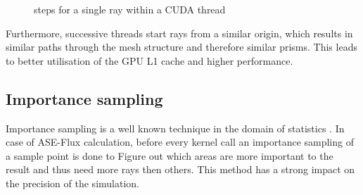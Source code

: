 \begin{figure}[H]
  \centerline
  {}
  \caption{steps for a single ray within a CUDA thread}
  \label{graphic:algorithm_steps}
\end{figure}

    Furthermore, successive threads start rays from a similar origin, which
    results in similar paths through the mesh structure and therefore similar
    prisms. This leads to better utilisation of the GPU L1 cache and higher
    performance.
    

\subsection{Importance sampling}
\label{subsec:importance_sampling}
Importance sampling is a well known technique in the domain
of statistics \cite{importanceSamplingSource}. In case of 
ASE-Flux calculation, before every kernel call an importance sampling 
of a sample point is done to Figure out which areas are more
important to the result and thus need more rays then others.
This method has a strong impact on the precision of the simulation.

